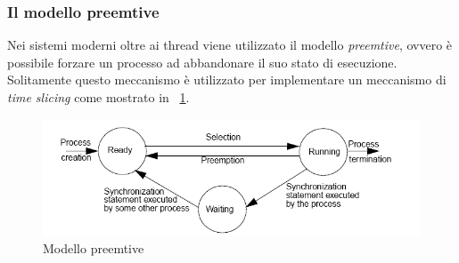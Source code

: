 \subsubsection{Il modello preemtive}
Nei sistemi moderni oltre ai thread viene utilizzato il modello \emph{preemtive}, ovvero è possibile forzare un processo ad abbandonare il suo stato di esecuzione. Solitamente questo meccanismo è utilizzato per implementare un meccanismo di \emph{time slicing} come mostrato in \figurename~\ref{fig:preemtive}.
\begin{figure}
\centering
\includegraphics[scale=0.8]{img/preemtive.png}
\caption{Modello preemtive}\label{fig:preemtive}
\end{figure}
